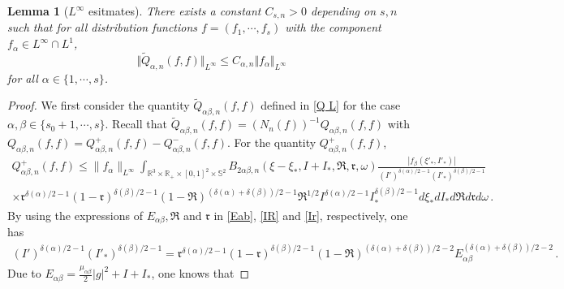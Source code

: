 \documentclass[reqno,11pt]{amsart}
\newtheorem{lemma}{Lemma}[section]
\numberwithin{equation}{section}
\def\R{\mathbb{R}}
\begin{document}
		
\begin{lemma}[$L^\infty$ esitmates]\label{Lemma 4.13 of infty}
		There exists a constant $C_{s, n} > 0$ depending on $s ,n$ such that for all distribution functions $f=(f_1,\cdots, f_s) $ with the component $f_\alpha \in L^\infty \cap L^1 $, 
		\begin{equation*}
			\Vert \tilde{Q}_{\alpha , n} (f,f) \Vert_{L^\infty } \leq C_{\alpha, n} \Vert f_\alpha \Vert_{L^\infty }
		\end{equation*}
for all $\alpha \in \{ 1, \cdots, s \}$.
	\end{lemma} 


\begin{proof}
We first consider the quantity $\tilde{Q}_{\alpha \beta, n} (f, f)$ defined in \eqref{Q L} for the case $\alpha ,\beta \in \{s_0+1,\cdots,s\}$. Recall that $\tilde{Q}_{\alpha \beta, n} (f, f) = ( N_n (f) )^{-1} Q_{\alpha \beta, n} (f,f)$ with $Q_{\alpha \beta, n} (f,f) = Q_{\alpha \beta, n}^+ (f,f) - Q_{\alpha \beta, n}^- (f,f)$. For the quantity $Q_{\alpha \beta, n}^+ (f,f)$,
\begin{equation*}
  \begin{aligned}
    Q_{\alpha \beta, n}^+ (f,f) \leq \| f_\alpha \|_{L^\infty} \int_{\R^3\times \R_+ \times [0,1]^2 \times \mathbb{S}^2 } B_{2\alpha \beta ,n} (\xi-\xi_*,I+I_*,\mathfrak{R},\mathfrak{r},\omega )\tfrac{ | f_{\beta}(\xi'_*,I'_*) | }{(I')^{\delta(\alpha)/2-1}(I'_*)^{\delta(\beta )/2-1}} \\
 \times \mathfrak{r}^{\delta(\alpha)/2-1} (1-\mathfrak{r})^{\delta (\beta )/2-1 } (1-\mathfrak{R} ) ^{(\delta (\alpha) +\delta (\beta ))/2-1} \mathfrak{R}^{1/2}
I^{\delta(\alpha)/2-1}I_*^{\delta(\beta )/2-1} d\xi_* dI_* d\mathfrak{R} d\mathfrak{r}d\omega \,.
  \end{aligned}
\end{equation*}
By using the expressions of $E_{\alpha \beta },\mathfrak{R}$ and $\mathfrak{r}$ in \eqref{Eab}, \eqref{IR} and \eqref{Ir}, respectively, one has
\begin{equation*}
  \begin{aligned}
    (I')^{\delta(\alpha)/2-1}(I'_*)^{\delta(\beta )/2-1} = \mathfrak{r}^{ \delta (\alpha) /2 - 1 } ( 1 - \mathfrak{r} )^{ \delta (\beta) /2 - 1 } ( 1 - \mathfrak{R} )^{ ( \delta (\alpha) + \delta (\beta) ) /2 - 2 } E_{\alpha \beta}^{ ( \delta (\alpha) + \delta (\beta) ) /2 - 2 } \,. 
  \end{aligned}
\end{equation*}
Due to $E_{\alpha \beta} = \tfrac{\mu_{ \alpha \beta }}{2} |g|^2 + I + I_*$, one knows that

\end{proof}
\end{document}

